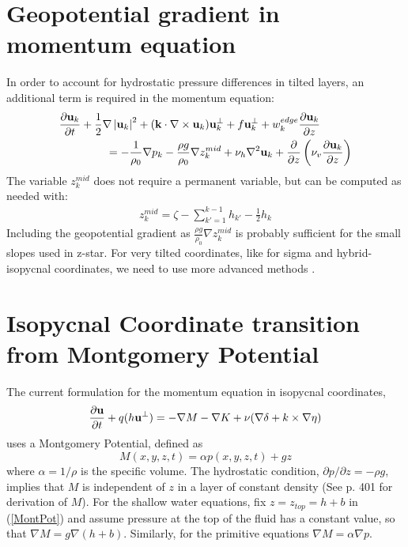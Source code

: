 \documentclass[11pt]{report}
\newcommand{\ds}{\displaystyle}
\newcommand{\bea}{\begin{eqnarray}}
\newcommand{\eea}{\end{eqnarray}}
\begin{document}
\section{Geopotential gradient in momentum equation}
In order to account for hydrostatic pressure differences in tilted layers, an additional term is required in the momentum equation:
\bea 
\label{u2} \ds
\frac{\partial {\bf u}_k}{\partial t} 
+ \frac{1}{2}\nabla \left| {\bf u}_k \right|^2 
+ ( {\bf k} \cdot \nabla \times {\bf u}_k) {\bf u}^\perp_k 
+ f{\bf u}^{\perp}_k 
+ w_k^{edge}\frac{\partial {\bf u}_k}{\partial z} \hspace{1cm} \nonumber \\
  = - \frac{1}{\rho_0}\nabla p_k  - \frac{\rho g}{\rho_0}\nabla z^{mid}_k
   +\nu_h\nabla^2{\bf u}_k
 + \frac{\partial }{\partial z} 
\left( \nu_v \frac{\partial {\bf u}_k}{\partial z} \right)
\eea
The variable $z^{mid}_k$ does not require a permanent variable, but can be computed as needed with:
\bea
z^{mid}_k = \zeta - \sum\limits_{k'=1}^{k-1}  h_{k'} - \frac{1}{2}h_k
\eea
Including the geopotential gradient as $\frac{\rho g}{\rho_0}\nabla z^{mid}_k$ is probably sufficient for the small slopes used in z-star.  For very tilted coordinates, like for sigma and hybrid-isopycnal coordinates, we need to use more advanced methods \citep{Shchepetkin_McWilliams03jgr}.


\newpage
\section{Isopycnal Coordinate transition from Montgomery Potential}
The current formulation for the momentum equation in isopycnal coordinates,
\begin{equation}
\label{continuous_velocity_pv2}
\frac{\partial {\bf u}}{\partial t} + q (h{\bf u^{\perp}}) 
  = - \nabla M  - \nabla K
   +\nu(\nabla \delta + k\times \nabla \eta)
\end{equation}
uses a  Montgomery Potential, defined as
\begin{equation}
\label{MontPot}
M(x,y,z,t) = \alpha p(x,y,z,t) + gz
\end{equation}
where $\alpha=1/\rho$ is the specific volume.  The hydrostatic condition, 
$\partial p/\partial z = -\rho g$, 
implies that $M$ is independent of $z$ in a layer of constant density (See \citet{Higdon06xacta} p. 401 for derivation of $M$).  For the shallow water equations, fix $z=z_{top}=h+b$ in (\ref{MontPot}) and assume pressure at the top of the fluid has a constant value, so that 
$\nabla M = g \nabla (h+b)$.  Similarly, for the primitive equations $\nabla M = \alpha \nabla p$.
\end{document}
